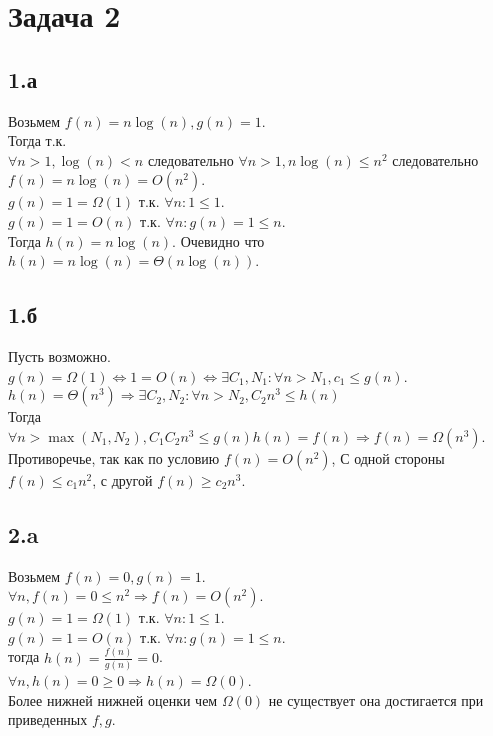 \documentclass[12pt]{exam}
\begin{document}
\section*{Задача 2}
\subsection*{1.а}
Возьмем $f(n) = n \log(n), g(n) = 1$.\\
Тогда т.к. \\
$\forall n > 1, \log(n) < n $ следовательно $ \forall n > 1, n \log(n) \leq n^2 $ следовательно $ f(n) = n \log(n) = O(n^2)$. \\
$g(n) = 1 = \Omega(1)$ т.к. $\forall n: 1 \leq 1$.\\
$g(n) = 1 = O(n)$ т.к. $\forall n: g(n) = 1 \leq n$.\\
Тогда $h(n) = n \log(n)$. Очевидно что $h(n) = n \log(n) = \Theta (n \log(n))$. 

\subsection*{1.б}
Пусть возможно.\\
$g(n) = \Omega(1) \Leftrightarrow 1 = O(n) \Leftrightarrow \exists C_1, N_1: \forall n > N_1, c_1 \leq g(n)$.\\
$h(n) = \Theta(n^3) \Rightarrow \exists C_2, N_2: \forall n > N_2, C_2 n^3 \leq h(n) $\\
Тогда $\forall n > \max(N_1, N_2), C_1 C_2 n^3 \leq g(n)h(n) = f(n) \Rightarrow f(n) = \Omega(n^3)$. \\
Противоречье, так как по условию $f(n) = O(n^2)$, С одной стороны $f(n) \leq c_1n^2$, с другой $f(n) \geq c_2n^3$.

\subsection*{2.a}

Возьмем $f(n) = 0, g(n) = 1$.\\
$\forall n, f(n) = 0 \leq n^2 \Rightarrow f(n) = O(n^2)$.\\
$g(n) = 1 = \Omega(1)$ т.к. $\forall n: 1 \leq 1$.\\
$g(n) = 1 = O(n)$ т.к. $\forall n: g(n) = 1 \leq n$.\\
тогда $h(n) = \frac{f(n)}{g(n)} = 0$.\\
$\forall n, h(n) = 0 \geq 0 \Rightarrow h(n) = \Omega(0)$. \\
Более нижней нижней оценки чем $\Omega(0)$ не существует она достигается при приведенных $f, g$.
\end{document}
